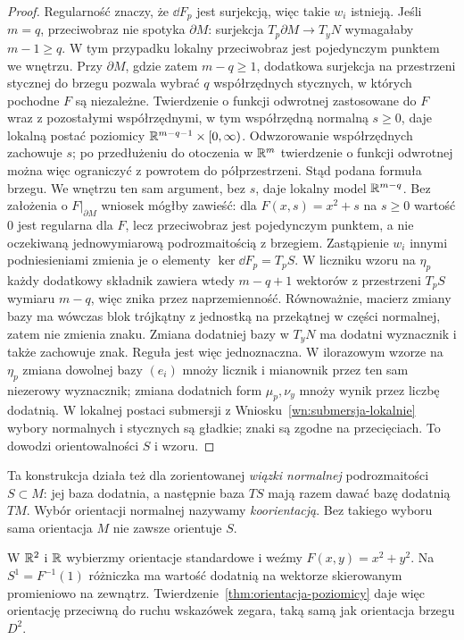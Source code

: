 \begin{proof}
Regularność znaczy, że $\dd F_p$ jest surjekcją,
więc takie $w_i$ istnieją. Jeśli $m=q$, przeciwobraz
nie spotyka $\partial M$: surjekcja
$T_p\partial M\to T_yN$ wymagałaby $m-1\geq q$.
W tym przypadku lokalny przeciwobraz jest pojedynczym
punktem we wnętrzu. Przy $\partial M$, gdzie zatem
$m-q\geq1$, dodatkowa
surjekcja na przestrzeni stycznej do brzegu pozwala wybrać
$q$ współrzędnych stycznych, w których pochodne $F$ są
niezależne. Twierdzenie o funkcji odwrotnej zastosowane
do $F$ wraz z pozostałymi współrzędnymi, w tym współrzędną
normalną $s\geq0$, daje lokalną postać poziomicy
$\mathbb{R}^{m-q-1}\times[0,\infty)$.
Odwzorowanie współrzędnych zachowuje $s$; po przedłużeniu
do otoczenia w $\mathbb{R}^m$ twierdzenie o funkcji odwrotnej
można więc ograniczyć z powrotem do półprzestrzeni.
Stąd podana formuła brzegu. We wnętrzu ten sam argument,
bez $s$, daje lokalny model $\mathbb{R}^{m-q}$.
Bez założenia o $F|_{\partial M}$ wniosek mógłby zawieść:
dla $F(x,s)=x^2+s$ na $s\geq0$ wartość $0$ jest regularna
dla $F$, lecz przeciwobraz jest pojedynczym punktem,
a nie oczekiwaną jednowymiarową podrozmaitością z brzegiem.
Zastąpienie $w_i$ innymi podniesieniami zmienia je o elementy
$\ker\dd F_p=T_pS$. W liczniku wzoru na $\eta_p$
każdy dodatkowy składnik zawiera wtedy $m-q+1$
wektorów z przestrzeni $T_pS$ wymiaru $m-q$,
więc znika przez naprzemienność. Równoważnie,
macierz zmiany bazy ma wówczas
blok trójkątny z jednostką na przekątnej w części
normalnej, zatem nie zmienia znaku. Zmiana
dodatniej bazy w $T_yN$ ma dodatni wyznacznik
i także zachowuje znak. Reguła jest więc
jednoznaczna. W ilorazowym wzorze na $\eta_p$ zmiana
dowolnej bazy $(e_i)$ mnoży licznik i mianownik przez
ten sam niezerowy wyznacznik; zmiana dodatnich form
$\mu_p,\nu_y$ mnoży wynik przez liczbę dodatnią.
W lokalnej postaci submersji z
Wniosku~\ref{wn:submersja-lokalnie} wybory normalnych
i stycznych są gładkie; znaki są zgodne na przecięciach.
To dowodzi orientowalności $S$ i wzoru.
\end{proof}

Ta konstrukcja działa też dla zorientowanej
\emph{wiązki normalnej} podrozmaitości $S\subset M$:
jej baza dodatnia, a następnie baza $TS$ mają razem
dawać bazę dodatnią $TM$. Wybór orientacji normalnej
nazywamy \emph{koorientacją}. Bez takiego wyboru sama
orientacja $M$ nie zawsze orientuje $S$.

\begin{przyklad}
W $\mathbb{R}^2$ i $\mathbb{R}$ wybierzmy orientacje standardowe
i weźmy $F(x,y)=x^2+y^2$. Na $S^1=F^{-1}(1)$
różniczka ma wartość dodatnią na wektorze
skierowanym promieniowo na zewnątrz.
Twierdzenie~\ref{thm:orientacja-poziomicy} daje więc
orientację przeciwną do ruchu wskazówek zegara,
taką samą jak orientacja brzegu $D^2$.
\end{przyklad}

